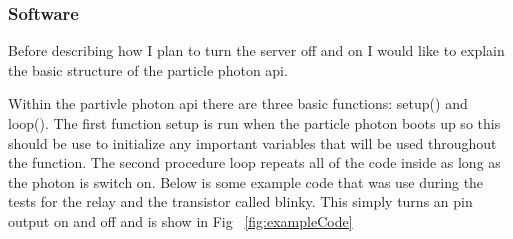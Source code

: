 \documentclass{article}
\begin{document}
\subsubsection{Software}
Before describing how I plan to turn the server off and on I would like to explain the basic structure of
the particle photon api.

Within the partivle photon api there are three basic functions: setup() and loop(). The first function
setup is run when the particle photon boots up so this should be use to initialize any important variables
that will be used throughout the function. The second procedure loop repeats all of the code inside as long
as the photon is switch on. Below is some example code that was use during the tests for the relay and the
transistor called blinky. This simply turns an pin output on and off and is show in Fig ~\ref{fig:exampleCode}
\end{document}
